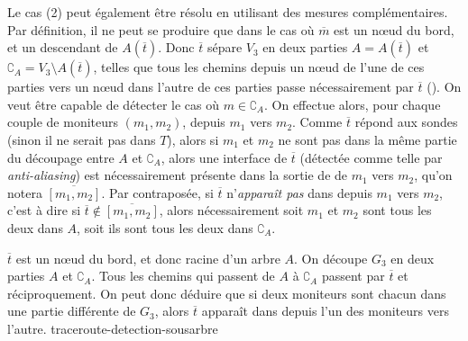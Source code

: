 Le cas (2) peut également être résolu en utilisant des mesures \traceroute
complémentaires. Par définition, il ne peut se produire que dans le cas où
$\overline{m}$ est un n\oe{}ud du bord, et un descendant de $A(\overline{t})$.
Donc $\overline{t}$ sépare $V_3$ en deux parties $A = A(\overline{t})$ et
$\complement_A = V_3 \setminus A(\overline{t})$, telles que tous les chemins
depuis un n\oe{}ud de l'une de ces parties vers un n\oe{}ud dans l'autre de ces
parties passe nécessairement par $\overline{t}$
().
On veut être capable de détecter le cas où $m \in \complement_A$. On effectue
alors, pour chaque couple de moniteurs $(m_1, m_2)$, \traceroute depuis $m_1$
vers $m_2$. Comme $\overline{t}$ répond aux sondes \traceroute (sinon il ne
serait pas dans $T$), alors si $m_1$ et $m_2$ ne sont pas dans la même partie du
découpage entre $A$ et $\complement_A$, alors une interface de $\overline{t}$
(détectée comme telle par {\em anti-aliasing}) est nécessairement présente dans
la sortie de \traceroute de $m_1$ vers $m_2$, qu'on notera $\overline{[m_1,
m_2]}$.
Par contraposée, si $\overline{t}$ n'{\em apparaît pas} dans \traceroute depuis
$m_1$ vers $m_2$, c'est à dire si $\overline{t} \notin \overline{[m_1, m_2]}$,
alors nécessairement soit $m_1$ et $m_2$ sont tous les deux dans $A$, soit ils
sont tous les deux dans $\complement_A$.

 {$\overline{t}$ est un n\oe{}ud du bord, et donc racine d'un arbre
$A$. On découpe $G_3$ en deux parties $A$ et $\complement_A$. Tous les chemins
qui passent de $A$ à $\complement_A$ passent par $\overline{t}$ et
réciproquement.
On peut donc déduire que si deux moniteurs sont chacun dans une partie
différente de $G_3$, alors $\overline{t}$ apparaît dans \traceroute depuis l'un
des moniteurs vers l'autre.} {traceroute-detection-sousarbre}

